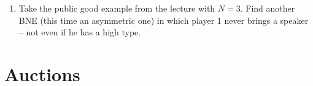 \documentclass[a4paper,12pt]{article}
\begin{document}
\begin{enumerate}[resume]
\item Take the public good example from the lecture with $N=3$. Find another BNE (this time an asymmetric one) in which player 1 never brings a speaker -- not even if he has a high type.
\end{enumerate}

\section{Auctions}
\label{sec:auctions}
\end{document}
